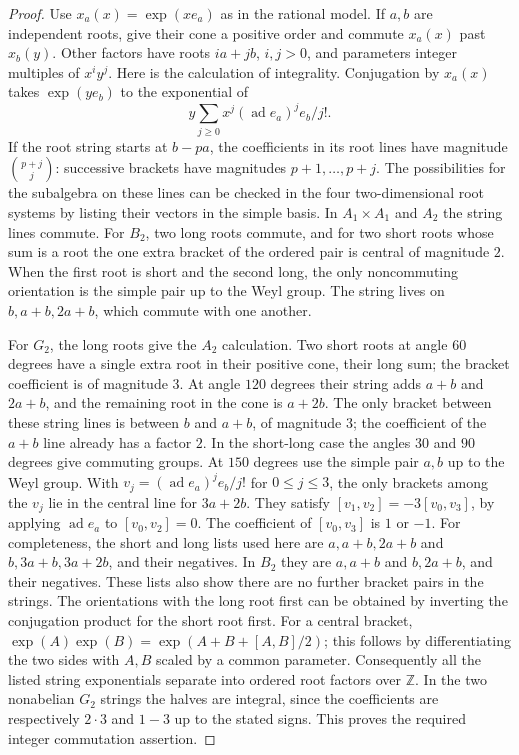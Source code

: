 \documentclass[11pt,a4paper,openany,oneside]{book}
\theoremstyle{resultstyle}
\theoremstyle{definition}
\numberwithin{equation}{chapter}
\newcommand{\ZZ}{\mathbb{Z}}
\begin{document}
\begin{proof}
Use \(x_a(x)=\exp(xe_a)\) as in the rational model.
If \(a,b\) are independent roots, give their cone a
positive order and commute \(x_a(x)\) past \(x_b(y)\).
Other factors have roots \(ia+jb\), \(i,j>0\),
and parameters integer multiples of \(x^iy^j\).
Here is the calculation of integrality. Conjugation
by \(x_a(x)\) takes \(\exp(ye_b)\) to the exponential
of
\[
 y\sum_{j\geq0}x^j(\operatorname{ad}e_a)^j e_b/j!.
\]
If the root string starts at \(b-pa\), the coefficients
in its root lines have magnitude \(\binom{p+j}{j}\):
successive brackets have magnitudes \(p+1,\ldots,p+j\).
The possibilities for the subalgebra on these lines
can be checked in the four two-dimensional root systems
by listing their vectors in the simple basis. In
\(A_1\times A_1\) and \(A_2\) the string lines commute.
For \(B_2\), two long roots commute, and for two
short roots whose sum is a root the one extra bracket
of the ordered pair is central of magnitude \(2\).
When the first root is short and the second long,
the only noncommuting orientation is the simple
pair up to the Weyl group. The string lives on
\(b,a+b,2a+b\), which commute with one another.

For \(G_2\), the long roots give the \(A_2\) calculation.
Two short roots at angle \(60\) degrees have a single
extra root in their positive cone, their long sum;
the bracket coefficient is of magnitude \(3\).
At angle \(120\) degrees their string adds \(a+b\)
and \(2a+b\), and the remaining root in the cone
is \(a+2b\). The only bracket between these string
lines is between \(b\) and \(a+b\), of magnitude
\(3\); the coefficient of the \(a+b\) line already
has a factor \(2\). In the short-long case the
angles \(30\) and \(90\) degrees give commuting
groups. At \(150\) degrees use the simple pair
\(a,b\) up to the Weyl group. With
\(v_j=(\operatorname{ad}e_a)^j e_b/j!\) for
\(0\leq j\leq 3\), the only brackets among the
\(v_j\) lie in the central line for \(3a+2b\).
They satisfy
\([v_1,v_2]=-3[v_0,v_3]\), by applying
\(\operatorname{ad}e_a\) to \([v_0,v_2]=0\).
The coefficient of \([v_0,v_3]\) is \(1\) or \(-1\).
For completeness, the short and long lists used
here are \(a,a+b,2a+b\) and \(b,3a+b,3a+2b\),
and their negatives. In \(B_2\) they are \(a,a+b\)
and \(b,2a+b\), and their negatives. These lists
also show there are no further bracket pairs in
the strings. The orientations with the long root
first can be obtained by inverting the
conjugation product for the short root first.
For a central bracket,
\(\exp(A)\exp(B)=\exp(A+B+[A,B]/2)\);
this follows by differentiating the two
sides with \(A,B\) scaled by a common parameter.
Consequently all the listed string exponentials
separate into ordered root factors over \(\ZZ\).
In the two nonabelian \(G_2\) strings the
halves are integral, since the coefficients
are respectively \(2\cdot3\) and \(1-3\)
up to the stated signs. This proves the
required integer commutation assertion.


\end{proof}
\end{document}
